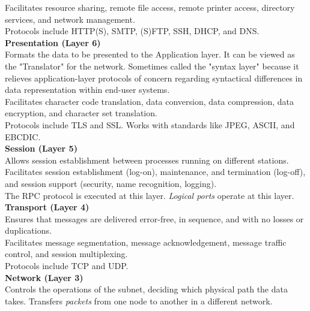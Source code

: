 \documentclass[12pt, titlepage]{article}
\begin{document}
Facilitates resource sharing, remote file access, remote printer access, directory services, and network management. \\

Protocols include HTTP(S), SMTP, (S)FTP, SSH, DHCP, and DNS. \\

\textbf{Presentation (Layer 6)} \\

Formats the data to be presented to the Application layer. It can be viewed as the "Translator" for the network. Sometimes called the "syntax layer" because it relieves application-layer protocols of concern regarding syntactical differences in data representation within end-user systems. \\

Facilitates character code translation, data conversion, data compression, data encryption, and character set translation. \\

Protocols include TLS and SSL. Works with standards like JPEG, ASCII, and EBCDIC. \\

\textbf{Session (Layer 5)} \\

Allows session establishment between processes running on different stations. \\

Facilitates session establishment (log-on), maintenance, and termination (log-off), and session support (security, name recognition, logging). \\

The RPC protocol is executed at this layer. \textit{Logical ports} operate at this layer. \\

\textbf{Transport (Layer 4)} \\

Ensures that messages are delivered error-free, in sequence, and with no losses or duplications. \\

Facilitates message segmentation, message acknowledgement, message traffic control, and session multiplexing. \\

Protocols include TCP and UDP. \\

\textbf{Network (Layer 3)} \\

Controls the operations of the subnet, deciding which physical path the data takes. Transfers \textit{packets} from one node to another in a different network. \\
\end{document}
